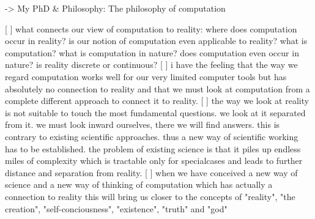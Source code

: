 	
-> My PhD \& Philosophy: The philosophy of computation

[ ] what connects our view of computation to reality: where does computation occur in reality? is our notion of computation even applicable to reality? what is computation? what is computation in nature? does computation even occur in nature? is reality discrete or continuous?
[ ] i have the feeling that the way we regard computation works well for our very limited computer tools but has absolutely no connection to reality and that we must look at computation from a complete different approach to connect it to reality.
[ ] the way we look at reality is not suitable to touch the most fundamental questions. we look at it separated from it. we must look inward ourselves, there we will find answers. this is contrary to existing scientific approaches. thus a new way of scientific working has to be established. the problem of existing science is that it piles up endless miles of complexity which is tractable only for specialcases and leads to further distance and separation from reality.
[ ] when we have conceived a new way of science and a new way of thinking of computation which has actually a connection to reality this will bring us closer to the concepts of "reality", "the creation", "self-conciousness", "existence", "truth" and "god"
